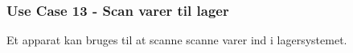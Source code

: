 

\subsubsection*{Use Case 13 - Scan varer til lager}
Et apparat kan bruges til at scanne scanne varer ind i lagersystemet. 
